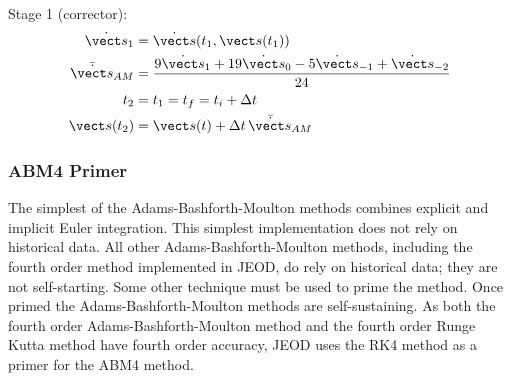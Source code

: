 Stage 1 (corrector):
\begin{equation}
\label{eqn:abm4_1}
\begin{split}
\dot{\vect s}_1 &= \dot{\vect s}(t_1,\vect s(t_1)) \\
\bar {\dot{\vect s}}_{AM} &=
  \frac{9\dot{\vect s}_1 +19\dot{\vect s}_0 -
        5\dot{\vect s}_{-1} + \dot{\vect s}_{-2}} {24} \\
t_2 &= t_1 = t_f = t_i + \Delta t \\
\vect s(t_2) &= \vect s(t) + \Delta t \, \bar {\dot{\vect s}}_{AM}
\end{split}
\end{equation}

\subsubsection{ABM4 Primer}
The simplest of the Adams-Bashforth-Moulton methods combines explicit
and implicit Euler integration. This simplest implementation does not
rely on historical data. All other Adams-Bashforth-Moulton methods,
including the fourth order method implemented in JEOD,
do rely on historical data; they are not self-starting.
Some other technique must be used to prime the method.
Once primed the Adams-Bashforth-Moulton methods are self-sustaining.
As both the fourth order Adams-Bashforth-Moulton method and the fourth order
Runge Kutta method have fourth order accuracy, JEOD uses the RK4 method
as a primer for the ABM4 method.

